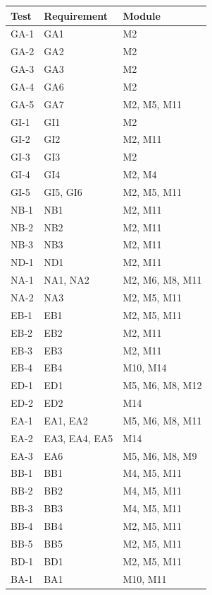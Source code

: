 \documentclass[12pt, titlepage]{article}
\begin{document}
\begin{longtable}{| p{} | p{} | p{}|}
  \hline
  Test & Requirement & Module\\
  \hline
  GA-1 & GA1 & M2\\
  \hline
  GA-2 & GA2 & M2\\
  \hline
  GA-3 & GA3 & M2\\
  \hline
  GA-4 & GA6 & M2\\
  \hline
  GA-5 & GA7 & M2, M5, M11\\
  \hline
  GI-1 & GI1 & M2\\
  \hline
  GI-2 & GI2 & M2, M11\\
  \hline
  GI-3 & GI3 & M2\\
  \hline
  GI-4 & GI4 & M2, M4\\
  \hline
  GI-5 & GI5, GI6 & M2, M5, M11\\
  \hline
  NB-1 & NB1 & M2, M11\\
  \hline
  NB-2 & NB2 & M2, M11\\
  \hline
  NB-3 & NB3 & M2, M11\\
  \hline
  ND-1 & ND1 & M2, M11\\
  \hline
  NA-1 & NA1, NA2 & M2, M6, M8, M11\\
  \hline
  NA-2 & NA3 & M2, M5, M11\\
  \hline
  EB-1 & EB1 & M2, M5, M11\\
  \hline
  EB-2 & EB2 & M2, M11\\
  \hline
  EB-3 & EB3 & M2, M11\\
  \hline
  EB-4 & EB4 & M10, M14\\
  \hline
  ED-1 & ED1 & M5, M6, M8, M12\\
  \hline
  ED-2 & ED2 & M14\\
  \hline
  EA-1 & EA1, EA2 & M5, M6, M8, M11\\
  \hline
  EA-2 & EA3, EA4, EA5 & M14\\
  \hline
  EA-3 & EA6 & M5, M6, M8, M9\\
  \hline
  BB-1 & BB1 & M4, M5, M11\\
  \hline
  BB-2 & BB2 & M4, M5, M11\\
  \hline
  BB-3 & BB3 & M4, M5, M11\\
  \hline
  BB-4 & BB4 & M2, M5, M11\\
  \hline
  BB-5 & BB5 & M2, M5, M11\\
  \hline
  BD-1 & BD1 &  M2, M5, M11\\
  \hline
  BA-1 & BA1 & M10, M11\\

\end{longtable}
\end{document}
